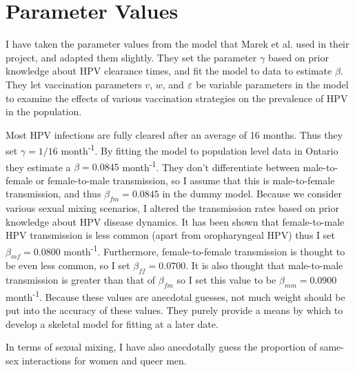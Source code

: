 \documentclass[12pt]{article}
\begin{document}
\section*{Parameter Values}

I have taken the parameter values from the model that Marek et al. used in their project, and adapted them slightly. They set the parameter $\gamma$ based on prior knowledge about HPV clearance times, and fit the model to data to estimate $\beta$. They let vaccination parameters $v$, $w$, and $\varepsilon$ be variable parameters in the model to examine the effects of various vaccination strategies on the prevalence of HPV in the population.

Most HPV infections are fully cleared after an average of 16 months.  Thus they set $\gamma=1/16$ month\textsuperscript{-1}.  By fitting the model to population level data in Ontario they estimate a $\beta=0.0845$ month\textsuperscript{-1}.  They don't differentiate between male-to-female or female-to-male transmission, so I assume that this is male-to-female transmission, and thus $\beta_{fm}=0.0845$ in the dummy model.  Because we consider various sexual mixing scenarios, I altered the transmission rates based on prior knowledge about HPV disease dynamics.  It has been shown that female-to-male HPV transmission is less common (apart from oropharyngeal HPV) thus I set $\beta_{mf}=0.0800$ month\textsuperscript{-1}.  Furthermore, female-to-female transmission is thought to be even less common, so I set $\beta_{ff}=0.0700$.  It is also thought that male-to-male transmission is greater than that of $\beta_{fm}$ so I set this value to be $\beta_{mm}=0.0900$ month\textsuperscript{-1}.  Because these values are anecdotal guesses, not much weight should be put into the accuracy of these values.  They purely provide a means by which to develop a skeletal model for fitting at a later date. 

In terms of sexual mixing, I have also anecdotally guess the proportion of same-sex interactions for women and queer men. 
\end{document}
